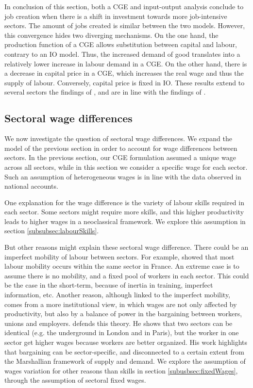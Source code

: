 In conclusion of this section, both a CGE and input-output analysis conclude to job creation when there is a shift in investment towards more job-intensive sectors. The amount of jobs created is similar between the two models. 
However, this convergence hides two diverging mechanisms. 
On the one hand, the production function of a CGE allows substitution between capital and labour, contrary to an IO model. Thus, the increased demand of good translates into a relatively lower increase in labour demand in a CGE. 
On the other hand, there is a decrease in capital price in a CGE, which increases the real wage and thus the supply of labour. Conversely, capital price is fixed in IO.
These results extend to several sectors the findings of \citet{Bovenberg1994, Bovenberg1996}, and are in line with the findings of \citet{Quirion2007}.


\subsection{Sectoral wage differences} \label{subsec:wageDifference}
We now investigate the question of sectoral wage differences.
We expand the model of the previous section in order to account for wage differences between sectors. In the previous section, our CGE formulation assumed a unique wage across all sectors, while in this section we consider a specific wage for each sector. Such an assumption of heterogeneous wages is in line with the data observed in national accounts. 

One explanation for the wage difference is the variety of labour skills required in each sector. Some sectors might require more skills, and this higher productivity leads to higher wages in a neoclassical framework. We explore this assumption in section \ref{subsubsec:labourSkills}.

But other reasons might explain these sectoral wage difference. There could be an imperfect mobility of labour between sectors. For example, \citet{Duhautois2005} showed that most labour mobility occurs within the same sector in France. An extreme case is to assume there is no mobility, and a fixed pool of workers in each sector. This could be the case in the short-term, because of inertia in training, imperfect information, etc.
Another reason, although linked to the imperfect mobility, comes from a more institutional view, in which wages are not only affected by productivity, but also by a balance of power in the bargaining between workers, unions and employers. \citet{Askenazy2016} defends this theory. He shows that two sectors can be identical (e.g. the underground in London and in Paris), but the worker in one sector get higher wages because workers are better organized. His work highlights that bargaining can be sector-specific, and disconnected to a certain extent from the Marshallian framework of supply and demand.
We explore the assumption of wages variation for other reasons than skills in section \ref{subusbsec:fixedWages}, through the assumption of sectoral fixed wages.


